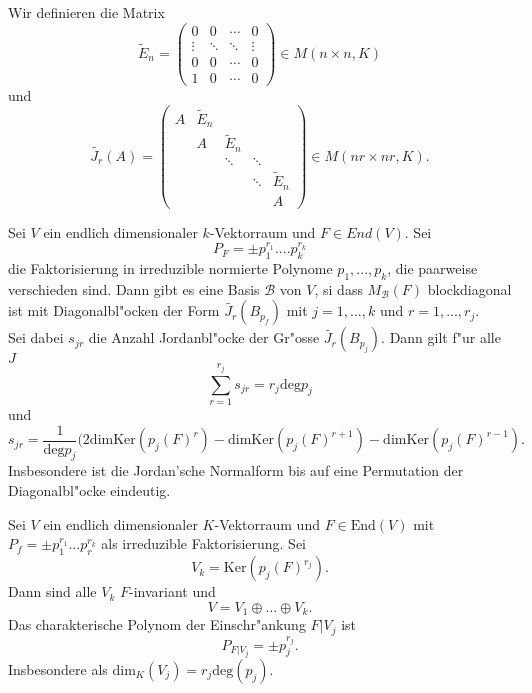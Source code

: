 \documentclass[8pt, a4paper, twocolumn, landscape]{article}
\begin{document}
{ \begin{definition}
 Wir definieren die Matrix
 $$
 \tilde{E}_n =
\left(\begin{array}{cccc}0 & 0 & \cdots & 0 \\ \vdots & \ddots & \ddots & \vdots \\ 0 & 0 & \cdots & 0 \\ 1 & 0 & \cdots & 0\end{array}\right) \in M(n \times n, K)
 $$
 und 
 $$
 \tilde{J_r}(A)
=\left(\begin{array}{ccccc}A & \tilde{E}_{n} & & & \\ & A & \tilde{E}_{n} & & \\ & & \ddots & \ddots & \\ & & & \ddots & \tilde{E}_{n} \\ & & & & A\end{array}\right) \in M(n r \times n r, K).
 $$
 \end{definition}
 
 
 \begin{theorem}
 Sei $V$ ein endlich dimensionaler $k$-Vektorraum und $F \in End(V)$. Sei
 $$
 P_F = \pm p_1^{r_1} .... p_k^{r_k}
 $$
 die Faktorisierung in irreduzible normierte Polynome $p_1, ..., p_k$, die paarweise verschieden sind. Dann gibt es eine Basis $\mathcal{B}$ von $V$, si dass $M_\mathcal{B}(F)$ blockdiagonal ist mit Diagonalbl"ocken der Form $\tilde{J_r}(B_{p_f})$ mit $j = 1, ..., k$ und $r = 1, ..., r_j$.
 \\ Sei dabei $s_{jr}$ die Anzahl Jordanbl"ocke der Gr"osse $\tilde{J_r}(B_{p_j})$. 
 Dann gilt f"ur alle $J$
 $$
 \sum\limits_{r = 1}^{r_j} s_{jr} = r_j \mathrm{deg} p_j
 $$
 und 
 $$
 s_{jr} = \frac{1}{\mathrm{deg}  p_j}(2 \mathrm{dim} \mathrm{Ker} (p_j(F)^r) -\mathrm{dim} \mathrm{Ker}(p_j(F)^{r+1}) - \mathrm{dim} \mathrm{Ker}(p_j(F)^{r-1}).
 $$
 Insbesondere ist die Jordan'sche Normalform bis auf eine Permutation der Diagonalbl"ocke eindeutig.
  
 \end{theorem}
 
 \begin{theorem}
 Sei $V$ ein endlich dimensionaler $K$-Vektorraum und $F \in \mathrm{End}(V)$ mit $P_f = \pm p_1^{r_1} ... p_r^{r_k}$ als irreduzible Faktorisierung. Sei 
 $$
 V_k = \mathrm{Ker}(p_j(F)^{r_j}).
 $$
 Dann sind alle $V_k$ $F$-invariant und
 $$
 V = V_1 \oplus ... \oplus V_k.
 $$
 Das charakterische Polynom der Einschr"ankung $F|V_j$ ist
 $$
 P_{F|V_j} = \pm p_j^{r_j}.
 $$
 Insbesondere als $\mathrm{dim}_K(V_j) = r_j \mathrm{deg}(p_j)$.
 \end{theorem}
 
 }
 
\end{document}
